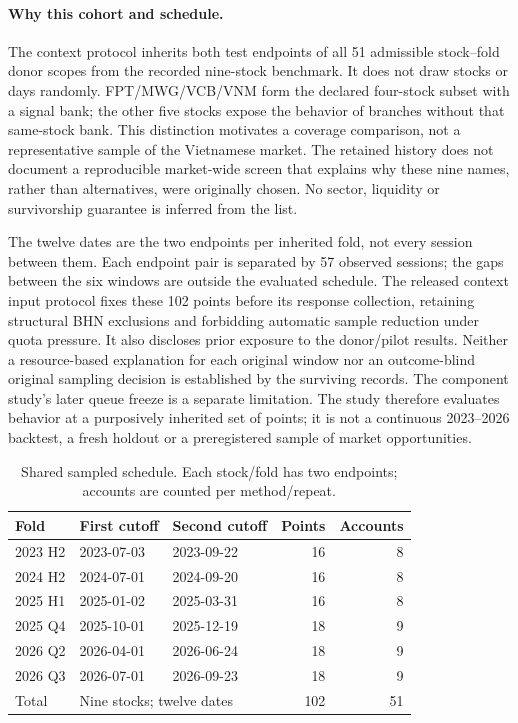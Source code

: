 \paragraph{Why this cohort and schedule.}
The context protocol inherits both test endpoints of all 51 admissible
stock--fold donor scopes from the recorded nine-stock benchmark. It does
not draw stocks or days randomly. FPT/MWG/VCB/VNM form the declared
four-stock subset with a signal bank; the other five stocks expose the
behavior of branches without that same-stock bank. This distinction
motivates a coverage comparison, not a representative sample of the
Vietnamese market. The retained history does not document a reproducible
market-wide screen that explains why these nine names, rather than
alternatives, were originally chosen. No sector, liquidity or
survivorship guarantee is inferred from the list.

The twelve dates are the two endpoints per inherited fold, not every
session between them. Each endpoint pair is separated by 57 observed
sessions; the gaps between the six windows are outside the evaluated
schedule. The released context input protocol fixes these 102 points
before its response collection, retaining structural BHN exclusions and
forbidding automatic sample reduction under quota pressure. It also
discloses prior exposure to the donor/pilot results. Neither a
resource-based explanation for each original window nor an outcome-blind
original sampling decision is established by the surviving records.
The component study's later queue freeze is a separate limitation.
The study therefore evaluates behavior at a purposively inherited set
of points; it is not a continuous 2023--2026 backtest, a fresh holdout or
a preregistered sample of market opportunities.

\begin{table}[htbp]\centering\small{}
\caption[Shared sampled market schedule]{Shared sampled schedule. Each stock/fold has two endpoints;
accounts are counted per method/repeat.}\label{tab:schedule}
\begin{tabular}{@{}l llrr@{}}\toprule
Fold & First cutoff & Second cutoff & Points & Accounts\\\midrule
2023 H2 & 2023-07-03 & 2023-09-22 &16&8\\
2024 H2 & 2024-07-01 & 2024-09-20 &16&8\\
2025 H1 & 2025-01-02 & 2025-03-31 &16&8\\
2025 Q4 & 2025-10-01 & 2025-12-19 &18&9\\
2026 Q2 & 2026-04-01 & 2026-06-24 &18&9\\
2026 Q3 & 2026-07-01 & 2026-09-23 &18&9\\\midrule
Total & \multicolumn{2}{l}{Nine stocks; twelve dates} &102&51\\\bottomrule
\end{tabular}\end{table}

